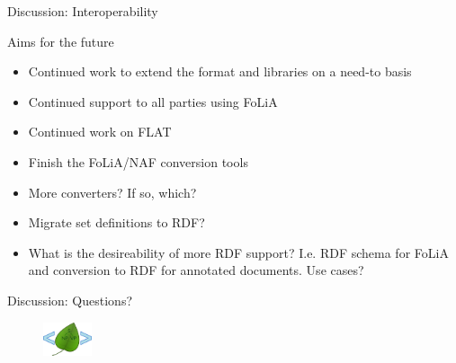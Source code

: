 \documentclass[xcolor=table,10pt,t]{beamer}
\begin{document}
\begin{frame}{Discussion: Interoperability}
    \begin{block}{Aims for the future}
        \begin{itemize}
            \item Continued work to extend the format and libraries on a need-to basis
            \item Continued support to all parties using FoLiA
            \item Continued work on FLAT
            \item Finish the FoLiA/NAF conversion tools
            \item More converters? If so, which?
            \item Migrate set definitions to RDF?
            \item What is the desireability of more RDF support? I.e. RDF
                schema for FoLiA and conversion to RDF for annotated documents.  Use cases?
        \end{itemize}
    \end{block}
\end{frame}

\begin{frame}{Discussion: Questions?}
        \vspace{3.5cm}
        \begin{figure}
        \includegraphics[height=1cm]{../logo.png}
        \end{figure}
\end{frame}
\end{document}
